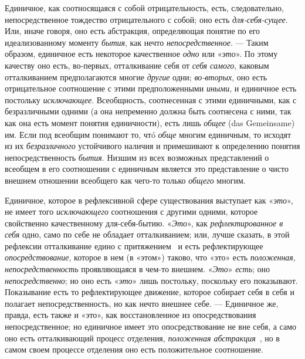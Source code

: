 \documentclass[twoside]{article}
\begin{document}
{{Единичное, как соотносящаяся с собой отрицательность, есть,
следовательно, непосредственное тождество отрицательного с собой; оно есть
{\em для-себя-сущее}.
Или, иначе говоря, оно есть абстракция, определяющая понятие
по его идеализованному моменту
{\em бытия}, как нечто
{\em непосредственное}. —
Таким образом, единичное есть некоторое качественное
{\em одно} или
«{\em это}». По этому
качеству оно есть, во-первых, отталкивание себя от
{\em себя самого},
каковым отталкиванием предполагаются многие
{\em другие} одни;
{\em во-вторых},
оно есть отрицательное соотношение с этими предположенными
{\em иными}, и
единичное есть постольку
{\em исключающее}.
Всеобщность, соотнесенная с этими единичными, как с
безразличными одними (а она непременно должна быть соотнесена с ними, так
как она есть момент понятия единичности), есть лишь
{\em общее} (das Gemeinsame)
им. Если под всеобщим понимают то, чтó
{\em обще} многим
единичным, то исходят из их
{\em безразличного}
устойчивого наличия и примешивают к определению понятия
непосредственность {\em бытия}.
Низшим из всех возможных представлений о всеобщем в его
соотношении с единичным является это представление о чисто внешнем
отношении всеобщего как чего-то только {\em общего} многим.

Единичное, которое в рефлексивной сфере существования
выступает как «{\em это}»,
не имеет того
{\em исключающего}
соотношения с другими одними, которое свойственно
качественному для-себя-бытию.
«{\em Это}», как
{\em рефлектированное в себя}
одно, само по себе не обладает отталкиванием; или, лучше
сказать, в этой рефлексии отталкивание едино с
притяжением~\label{bkm:bm24}
и есть рефлектирующее
{\em опосредствование},
которое в нем (в «этом») таково, что «это» есть {\em положенная},
{\em непосредственность} проявляющаяся в чем-то внешнем. «{\em Это}»
{\em есть}; оно
{\em непосредственно}; но
оно есть «{\em это}» лишь
постольку, поскольку его показывают. Показывание есть то рефлектирующее
движение, которое собирает себя в себя и полагает непосредственность, но
как нечто внешнее себе. — Единичное же,
правда, есть также и «это», как восстановленное из опосредствования
непосредственное; но единичное имеет это опосредствование не вне себя, а
само оно есть отталкивающий процесс отделения,
{\em положенная
абстракция}~\label{bkm:bm25},
но в самом своем процессе отделения оно есть положительное соотношение.

}}
\end{document}

